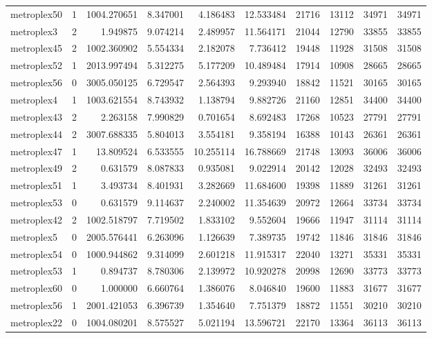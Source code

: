 \begin{longtable}{|l|r|r|r|r|r|r|r|r|r|}
metroplex50 & 1 & 1004.270651 & 8.347001 & 4.186483 & 12.533484 & 21716 & 13112 & 34971 & 34971 \\
metroplex3 & 2 & 1.949875 & 9.074214 & 2.489957 & 11.564171 & 21044 & 12790 & 33855 & 33855 \\
metroplex45 & 2 & 1002.360902 & 5.554334 & 2.182078 & 7.736412 & 19448 & 11928 & 31508 & 31508 \\
metroplex52 & 1 & 2013.997494 & 5.312275 & 5.177209 & 10.489484 & 17914 & 10908 & 28665 & 28665 \\
metroplex56 & 0 & 3005.050125 & 6.729547 & 2.564393 & 9.293940 & 18842 & 11521 & 30165 & 30165 \\
metroplex4 & 1 & 1003.621554 & 8.743932 & 1.138794 & 9.882726 & 21160 & 12851 & 34400 & 34400 \\
metroplex43 & 2 & 2.263158 & 7.990829 & 0.701654 & 8.692483 & 17268 & 10523 & 27791 & 27791 \\
metroplex44 & 2 & 3007.688335 & 5.804013 & 3.554181 & 9.358194 & 16388 & 10143 & 26361 & 26361 \\
metroplex47 & 1 & 13.809524 & 6.533555 & 10.255114 & 16.788669 & 21748 & 13093 & 36006 & 36006 \\
metroplex49 & 2 & 0.631579 & 8.087833 & 0.935081 & 9.022914 & 20142 & 12028 & 32493 & 32493 \\
metroplex51 & 1 & 3.493734 & 8.401931 & 3.282669 & 11.684600 & 19398 & 11889 & 31261 & 31261 \\
metroplex53 & 0 & 0.631579 & 9.114637 & 2.240002 & 11.354639 & 20972 & 12664 & 33734 & 33734 \\
metroplex42 & 2 & 1002.518797 & 7.719502 & 1.833102 & 9.552604 & 19666 & 11947 & 31114 & 31114 \\
metroplex5 & 0 & 2005.576441 & 6.263096 & 1.126639 & 7.389735 & 19742 & 11846 & 31846 & 31846 \\
metroplex54 & 0 & 1000.944862 & 9.314099 & 2.601218 & 11.915317 & 22040 & 13271 & 35331 & 35331 \\
metroplex53 & 1 & 0.894737 & 8.780306 & 2.139972 & 10.920278 & 20998 & 12690 & 33773 & 33773 \\
metroplex60 & 0 & 1.000000 & 6.660764 & 1.386076 & 8.046840 & 19600 & 11883 & 31677 & 31677 \\
metroplex56 & 1 & 2001.421053 & 6.396739 & 1.354640 & 7.751379 & 18872 & 11551 & 30210 & 30210 \\
metroplex22 & 0 & 1004.080201 & 8.575527 & 5.021194 & 13.596721 & 22170 & 13364 & 36113 & 36113 \\

\end{longtable}
